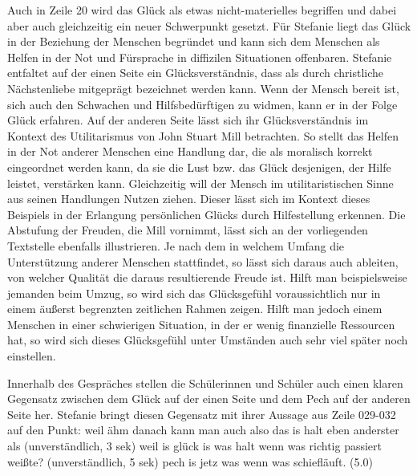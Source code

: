 Auch in Zeile 20 wird das Glück als etwas nicht-materielles begriffen und dabei aber auch gleichzeitig ein neuer Schwerpunkt gesetzt. 
Für Stefanie liegt das Glück in der Beziehung der Menschen begründet und kann sich dem Menschen als Helfen in der Not und Fürsprache in diffizilen Situationen offenbaren.
 Stefanie entfaltet auf der einen Seite ein Glücksverständnis, dass als durch christliche Nächstenliebe mitgeprägt bezeichnet werden kann. 
 Wenn der Mensch bereit ist, sich auch den Schwachen und Hilfsbedürftigen zu widmen, kann er in der Folge Glück erfahren. 
 Auf der anderen Seite lässt sich ihr Glücksverständnis im Kontext des Utilitarismus von John Stuart Mill betrachten. 
 So stellt das Helfen in der Not anderer Menschen eine Handlung dar, die als moralisch korrekt eingeordnet werden kann, da sie die Lust bzw. das Glück desjenigen, der Hilfe leistet, verstärken kann. 
 Gleichzeitig will der Mensch im utilitaristischen Sinne aus seinen Handlungen Nutzen ziehen. 
 Dieser lässt sich im Kontext dieses Beispiels in der Erlangung persönlichen Glücks durch Hilfestellung erkennen. 
 Die Abstufung der Freuden, die Mill vornimmt, lässt sich an der vorliegenden Textstelle ebenfalls illustrieren. 
 Je nach dem in welchem Umfang die Unterstützung anderer Menschen stattfindet, so lässt sich daraus auch ableiten, von welcher Qualität die daraus resultierende Freude ist. 
 Hilft man beispielsweise jemanden beim Umzug, so wird sich das Glücksgefühl voraussichtlich nur in einem äußerst begrenzten zeitlichen Rahmen zeigen. 
 Hilft man jedoch einem Menschen in einer schwierigen Situation, in der er wenig finanzielle Ressourcen hat, so wird sich dieses Glücksgefühl unter Umständen auch sehr viel später noch einstellen.
 
Innerhalb des Gespräches stellen die Schülerinnen und Schüler auch einen klaren Gegensatz zwischen dem Glück auf der einen Seite und dem Pech auf der anderen Seite her. 
Stefanie bringt diesen Gegensatz mit ihrer Aussage aus Zeile 029-032 auf den Punkt:
\glqq weil ähm danach kann man auch also das is halt eben anderster als (unverständlich, 3 sek) weil is glück is was halt wenn was richtig passiert weißte? (unverständlich, 5 sek) pech is jetz was wenn was schiefläuft. (5.0)\grqq{}

